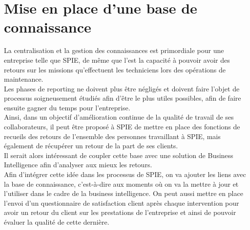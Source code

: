 \section{Mise en place d’une base de connaissance}

La centralisation et la gestion des connaissances est primordiale pour une entreprise telle que SPIE, de même que l’est la capacité à pouvoir avoir des retours sur les missions qu’effectuent les techniciens lors des opérations de maintenance. \\

Les phases de reporting ne doivent plus être négligés et doivent faire l’objet de processus soigneusement étudiés afin d’être le plus utiles possibles, afin de faire ensuite gagner du temps pour l’entreprise. \\

Ainsi, dans un objectif d’amélioration continue de la qualité de travail de ses collaborateurs, il peut être proposé à SPIE de mettre en place des fonctions de recueils des retours de l’ensemble des personnes travaillant à SPIE, mais également de récupérer un retour de la part de ses clients. \\

Il serait alors intéressant de coupler cette base avec une solution de Business Intelligence afin d’analyser aux mieux les retours. \\

Afin d’intégrer cette idée dans les processus de SPIE, on va ajouter les liens avec la base de connaissance, c’est-à-dire aux moments où on va la mettre à jour et l’utiliser dans le cadre de la business intelligence. On peut aussi mettre en place l’envoi d’un questionnaire de satisfaction client après chaque intervention pour avoir un retour du client sur les prestations de l’entreprise et ainsi de pouvoir évaluer la qualité de cette dernière.
